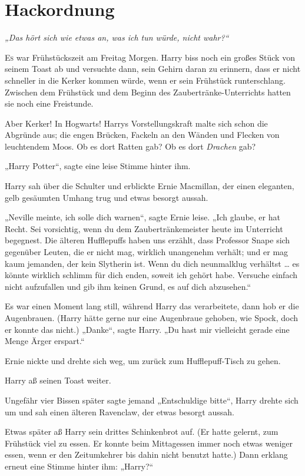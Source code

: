 \chapter{Hackordnung}

\emph{„Das hört sich wie etwas an, was ich tun würde, nicht wahr?“} 

\later 

\lettrine{E}{s} war Frühstückszeit am Freitag Morgen. Harry biss noch ein großes Stück von seinem Toast ab und versuchte dann, sein Gehirn daran zu erinnern, dass er nicht schneller in die Kerker kommen würde, wenn er sein Frühstück runterschlang. Zwischen dem Frühstück und dem Beginn des Zaubertränke-Unterrichts hatten sie noch eine Freistunde. 

Aber Kerker! In Hogwarts! Harrys Vorstellungskraft malte sich schon die Abgründe aus; die engen Brücken, Fackeln an den Wänden und Flecken von leuchtendem Moos. Ob es dort Ratten gab? Ob es dort \emph{Drachen} gab? 

„Harry Potter“, sagte eine leise Stimme hinter ihm. 

Harry sah über die Schulter und erblickte Ernie Macmillan, der einen eleganten, gelb gesäumten Umhang trug und etwas besorgt aussah. 

„Neville meinte, ich solle dich warnen“, sagte Ernie leise. „Ich glaube, er hat Recht. Sei vorsichtig, wenn du dem Zaubertränkemeister heute im Unterricht begegnest. Die älteren Hufflepuffs haben uns erzählt, dass Professor Snape sich gegenüber Leuten, die er nicht mag, wirklich unangenehm verhält; und er mag kaum jemanden, der kein Slytherin ist. Wenn du dich neunmalklug verhältst … es könnte wirklich schlimm für dich enden, soweit ich gehört habe. Versuche einfach nicht aufzufallen und gib ihm keinen Grund, es auf dich abzusehen.“ 

Es war einen Moment lang still, während Harry das verarbeitete, dann hob er die Augenbrauen. (Harry hätte gerne nur eine Augenbraue gehoben, wie Spock, doch er konnte das nicht.) „Danke“, sagte Harry. „Du hast mir vielleicht gerade eine Menge Ärger erspart.“

Ernie nickte und drehte sich weg, um zurück zum Hufflepuff-Tisch zu gehen. 

Harry aß seinen Toast weiter. 

Ungefähr vier Bissen später sagte jemand „Entschuldige bitte“, Harry drehte sich um und sah einen älteren Ravenclaw, der etwas besorgt aussah. 

Etwas später aß Harry sein drittes Schinkenbrot auf. (Er hatte gelernt, zum Frühstück viel zu essen. Er konnte beim Mittagessen immer noch etwas weniger essen, wenn er den Zeitumkehrer bis dahin nicht benutzt hatte.) Dann erklang erneut eine Stimme hinter ihm: „Harry?“ 

